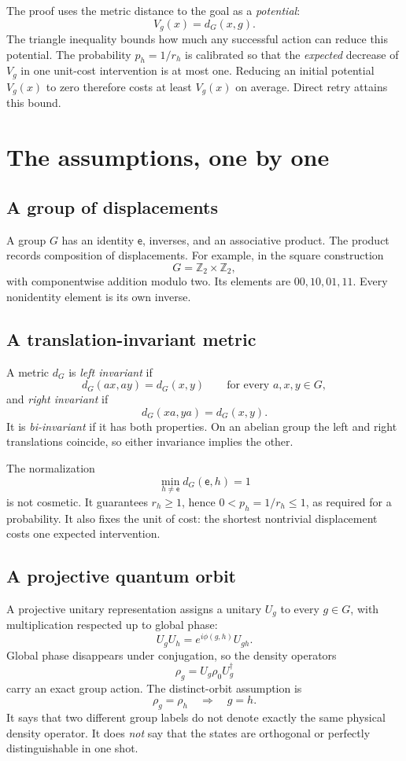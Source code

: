 \documentclass[11pt]{article}
\theoremstyle{definition}
\theoremstyle{remark}
\newcommand{\Z}{\mathbb Z}
\newcommand{\id}{\mathsf e}
\begin{document}
The proof uses the metric distance to the goal as a \emph{potential}:
\[
  V_g(x)=d_G(x,g).
\]
The triangle inequality bounds how much any successful action can reduce this
potential. The probability \(p_h=1/r_h\) is calibrated so that the
\emph{expected} decrease of \(V_g\) in one unit-cost intervention is at most
one. Reducing an initial potential \(V_g(x)\) to zero therefore costs at least
\(V_g(x)\) on average. Direct retry attains this bound.

\section{The assumptions, one by one}

\subsection{A group of displacements}

A group \(G\) has an identity \(\id\), inverses, and an associative product.
The product records composition of displacements.  For example, in the square
construction
\[
  G=\Z_2\times\Z_2,
\]
with componentwise addition modulo two.  Its elements are
\(00,10,01,11\). Every nonidentity element is its own inverse.

\subsection{A translation-invariant metric}

A metric \(d_G\) is \emph{left invariant} if
\[
  d_G(ax,ay)=d_G(x,y)
  \qquad\text{for every }a,x,y\in G,
\]
and \emph{right invariant} if
\[
  d_G(xa,ya)=d_G(x,y).
\]
It is \emph{bi-invariant} if it has both properties.  On an abelian group the
left and right translations coincide, so either invariance implies the other.

The normalization
\[
  \min_{h\ne\id}d_G(\id,h)=1
  \label{eq:normalization}
\]
is not cosmetic. It guarantees \(r_h\ge1\), hence
\(0<p_h=1/r_h\le1\), as required for a probability. It also fixes the unit
of cost: the shortest nontrivial displacement costs one expected
intervention.

\subsection{A projective quantum orbit}

A projective unitary representation assigns a unitary \(U_g\) to every
\(g\in G\), with multiplication respected up to global phase:
\[
  U_gU_h=e^{i\phi(g,h)}U_{gh}.
\]
Global phase disappears under conjugation, so the density operators
\[
  \rho_g=U_g\rho_0U_g^\dagger
\]
carry an exact group action.  The distinct-orbit assumption is
\[
  \rho_g=\rho_h\quad\Longrightarrow\quad g=h.
  \label{eq:distinct}
\]
It says that two different group labels do not denote exactly the same
physical density operator.  It does \emph{not} say that the states are
orthogonal or perfectly distinguishable in one shot.
\end{document}
